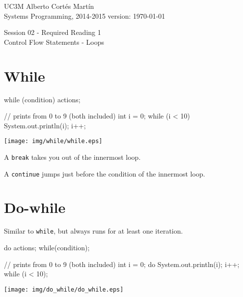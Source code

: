\documentclass[a4paper, 12pt]{article}
\newcommand{\realtitle}{Session 02 - Required Reading 1}
\begin{document}
\makebox[\linewidth]{\rule{\textwidth}{0.4pt}}
UC3M \hfill Alberto Cortés Martín\\
Systems Programming, 2014-2015 \hfill version: \today\\
\makebox[\linewidth]{\rule{\textwidth}{0.4pt}}
\begin{center}
  \Large{\realtitle}\\Control Flow Statements - Loops
\end{center}
\makebox[\linewidth]{\rule{\textwidth}{0.4pt}}
\vspace{0.5cm}

\tableofcontents
\vspace{1cm}

\section{While}

\begin{multicols}{2}
\begin{blackboard}
        while (condition) {
            actions;
        }

// prints from 0 to 9 (both included)
int i = 0;
while (i < 10) {
  System.out.println(i);
  i++;
}
\end{blackboard}

\columnbreak

\begin{center}
  \texttt{[image: img/while/while.eps]}
\end{center}

\end{multicols}

A \verb+break+ takes you out of the innermost loop.

A \verb+continue+ jumps just before the condition of the innermost loop.


\section{Do-while}

Similar to \verb+while+, but always runs for at least one iteration.

\begin{multicols}{2}
\begin{blackboard}
        do {
            actions;
        } while(condition);

// prints from 0 to 9 (both included)
int i = 0;
do {
    System.out.println(i);
    i++;
} while (i < 10);
\end{blackboard}

\columnbreak

\begin{center}
  \texttt{[image: img/do\_while/do\_while.eps]}
\end{center}

\end{multicols}
\end{document}
